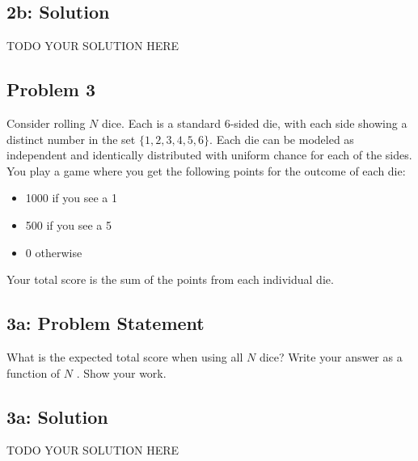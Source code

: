 \documentclass[10pt]{article}
\newcommand{\officialdirections}[1]{{\color{purple} #1}}
\begin{document}
\subsection{2b: Solution}
TODO YOUR SOLUTION HERE

\officialdirections{
\subsection*{Problem 3}

Consider rolling $N$
 dice. Each is a standard 6-sided die, with each side showing a distinct number in the set $\{1,2,3,4,5,6\}$. Each die can be modeled as independent and identically distributed with uniform chance for each of the sides.
You play a game where you get the following points for the outcome of each die:
\begin{itemize}
\item 1000 if you see a 1
\item 500 if you see a 5
\item 0 otherwise
\end{itemize}
Your total score is the sum of the points from each individual die.
}


\officialdirections{
\subsection*{3a: Problem Statement}
What is the expected total score when using all $N$
 dice? Write your answer as a function of $N$
. Show your work.
}

\subsection{3a: Solution}
TODO YOUR SOLUTION HERE
\end{document}
